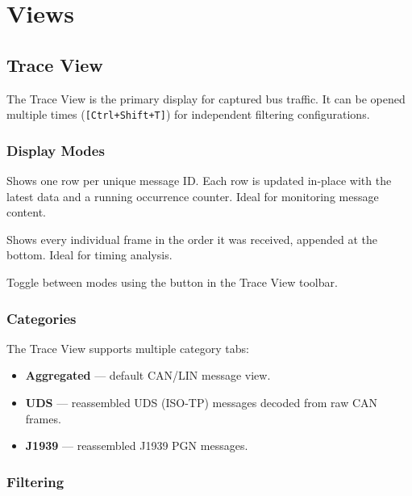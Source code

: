 \documentclass[a4paper,11pt]{article}
\newcommand{\key}[1]{\texttt{\small[#1]}}
\newcommand{\ui}[1]{\textbf{#1}}
\begin{document}
\section{Views}
\label{sec:views}

\subsection{Trace View}

The Trace View is the primary display for captured bus traffic. It can be opened
multiple times (\key{Ctrl+Shift+T}) for independent filtering configurations.

\subsubsection{Display Modes}

\begin{description}[leftmargin=2em, style=nextline]
  \item[Aggregated mode] Shows one row per unique message ID. Each row is updated
        in-place with the latest data and a running occurrence counter. Ideal for
        monitoring message content.
  \item[Unified / Chronological mode] Shows every individual frame in the order it
        was received, appended at the bottom. Ideal for timing analysis.
\end{description}

Toggle between modes using the button in the Trace View toolbar.

\subsubsection{Categories}

The Trace View supports multiple category tabs:
\begin{itemize}
  \item \ui{Aggregated} — default CAN/LIN message view.
  \item \ui{UDS} — reassembled UDS (ISO-TP) messages decoded from raw CAN frames.
  \item \ui{J1939} — reassembled J1939 PGN messages.
\end{itemize}

\subsubsection{Filtering}
\end{document}
